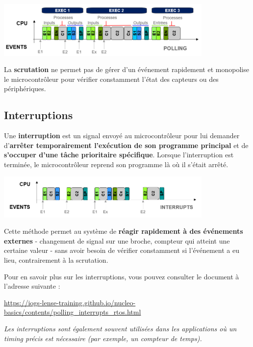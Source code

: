 \documentclass[a4paper,11pt,titlepage]{article} %
\begin{document}
\begin{center}
	\includegraphics[width=0.8\textwidth]{images/gen_polling.png}
\end{center}

La \textbf{scrutation} ne permet pas de gérer d'un événement rapidement et monopolise le microcontrôleur pour vérifier constamment l'état des capteurs ou des périphériques.


\subsection{Interruptions}

Une \textbf{interruption} est un signal envoyé au microcontrôleur pour lui demander d'\textbf{arrêter temporairement l'exécution de son programme principal} et de \textbf{s'occuper d'une tâche prioritaire spécifique}. Lorsque l'interruption est terminée, le microcontrôleur reprend son programme là où il s'était arrêté.

\begin{center}
	\includegraphics[width=0.8\textwidth]{images/gen_isr.png}
\end{center}


Cette méthode permet au système de \textbf{réagir rapidement à des événements externes} - changement de signal sur une broche, compteur qui atteint une certaine valeur - sans avoir besoin de vérifier constamment si l'événement a eu lieu, contrairement à la scrutation. 

Pour en savoir plus sur les interruptions, vous pouvez consulter le document à l'adresse suivante :

\href{https://iogs-lense-training.github.io/nucleo-basics/contents/polling_interrupts_rtos.html}{https://iogs-lense-training.github.io/nucleo-basics/contents/polling\_interrupts\_rtos.html}

\textit{Les interruptions sont également souvent utilisées dans les applications où un timing précis est nécessaire (par exemple, un compteur de temps).}
\end{document}
